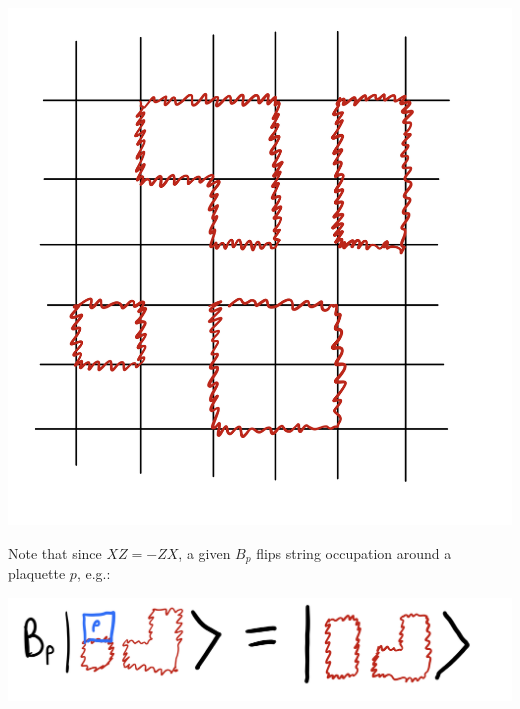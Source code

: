 \begin{center}
    \includegraphics[scale=0.4]{Lectures/Images/lec1-stringsallowed.png}
\end{center}

Note that since $XZ = -ZX$, a given $B_p$ flips string occupation around a plaquette $p$, e.g.:

\begin{center}
    \includegraphics[scale=0.3]{Lectures/Images/lec1-plaquette.png}
\end{center}


